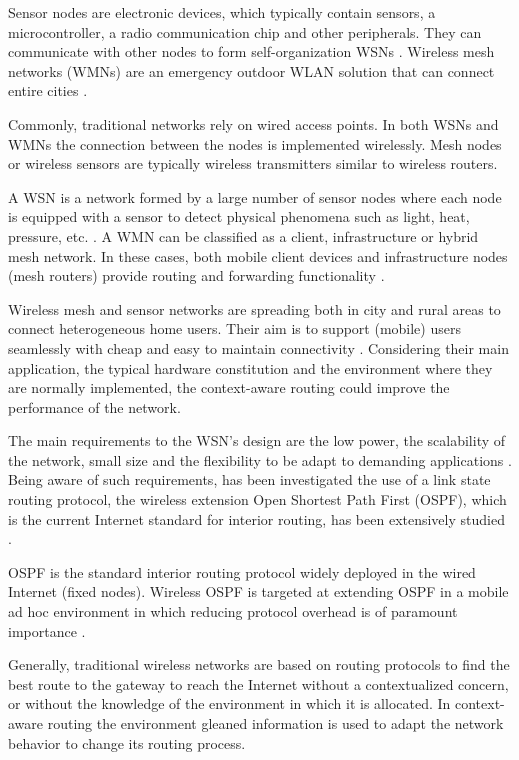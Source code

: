 \documentclass[conference]{IEEEtran}
\begin{document}
Sensor nodes are electronic devices, which typically contain sensors, a microcontroller, a radio communication chip and other peripherals. They can communicate with other nodes to form self-organization WSNs \cite{Son2009}. Wireless mesh networks (WMNs) are an emergency outdoor WLAN solution that can connect entire cities \cite{Akyildiz2009}.

Commonly, traditional networks rely on wired access points. In both WSNs and WMNs the connection between the nodes is implemented wirelessly. Mesh nodes or wireless sensors are typically wireless transmitters similar to wireless routers.

A WSN is a network formed by a large number of sensor nodes where each node is equipped with a sensor to detect physical phenomena such as light, heat, pressure, etc. \cite{IEC2014}. A WMN can be classified as a client, infrastructure or hybrid mesh network. In these cases, both mobile client devices and infrastructure nodes (mesh routers) provide routing and forwarding functionality \cite{Piezhao2008}.

Wireless mesh and sensor networks are spreading both in city and rural areas to connect heterogeneous home users. Their aim is to support (mobile) users seamlessly with cheap and easy to maintain connectivity \cite{Matos2013, Bhagwat2003, Johnson2007}. Considering their main application, the typical hardware constitution and the environment where they are normally implemented, the context-aware routing could improve the performance of the network.

The main requirements to the WSN's design are the low power, the scalability of the network, small size and the flexibility to be adapt to demanding applications \cite{Leon2015}. Being aware of such requirements, has been investigated the use of a link state routing protocol, the wireless extension Open Shortest Path First (OSPF), which is the current Internet standard for interior routing, has been extensively studied \cite{Holter2010, Fuertes2012}.

OSPF is the standard interior routing protocol widely deployed in the wired Internet (fixed nodes). Wireless OSPF is targeted at extending OSPF in a mobile ad hoc environment in which reducing protocol overhead is of paramount importance \cite{Holter2010}.

Generally, traditional wireless networks are based on routing protocols to find the best route to the gateway to reach the Internet without a contextualized concern, or without the knowledge of the environment in which it is allocated. In context-aware routing the environment gleaned information is used to adapt the network behavior to change its routing process.
\end{document}
